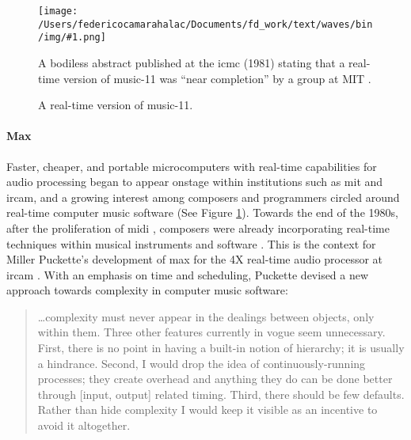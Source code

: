\documentclass[
]{book}
\newcommand{\fsee}[1]{(See Figure \ref{img:#1})}
\newcommand{\img}[4]{
\begin{figure}[!htbp]
\centering
\texttt{[image: /Users/federicocamarahalac/Documents/fd\_work/text/waves/bin/img/\#1.png]}
\caption{#4}
\label{img:#1}
#3
\end{figure}
\FloatBarrier
}
\begin{document}
\img{realtime}{0.9}{
A bodiless abstract published at the \gls{icmc} (1981) stating that a real-time version of \gls{music-11} was ``near completion'' by a group at MIT \parencite{DBLP:conf/icmc/PucketteVS81}.
}{A real-time version of \gls{music-11}.}

\paragraph{Max}
\label{computer:real-time}

Faster, cheaper, and portable microcomputers with real-time capabilities for audio processing began to appear onstage within institutions such as \gls{mit} and \gls{ircam}, and a growing interest among composers and programmers circled around real-time computer music software \fsee{realtime}. Towards the end of the 1980s, after the proliferation of \gls{midi} \parencite{Loy85:Mus}, composers were already incorporating real-time techniques within musical instruments and software \parencites{Ver84:The}{Puc91:Som}. This is the context for Miller Puckette's development of \gls{max} for the 4X real-time audio processor at \gls{ircam} \parencite{DBLP:conf/icmc/Puckette86}. With an emphasis on time and scheduling, Puckette devised a new approach towards complexity in computer music software:

\begin{quote}
	\dots complexity must never appear in the dealings between objects, only within them. Three other features currently in vogue seem unnecessary. First, there is no point in having a built-in notion of hierarchy; it is usually a hindrance. Second, I would drop the idea of continuously-running processes; they create overhead and anything they do can be done better through [input, output] related timing. Third, there should be few defaults. Rather than hide complexity I would keep it visible as an incentive to avoid it altogether. \parencite[43]{DBLP:conf/icmc/Puckette86}
\end{quote}
\end{document}
